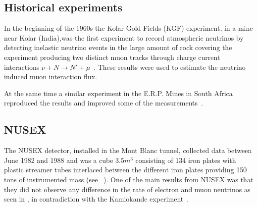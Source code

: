 

\subsection{Historical experiments}
In the beginning of the 1960s the Kolar Gold Fields (KGF) experiment, in a mine near Kolar (India),was the first experiment to record atmospheric neutrinos by detecting inelastic neutrino events in the large amount of rock covering the experiment producing two distinct muon tracks through charge current interactions $\nu + N \rightarrow N' + \mu $~\cite{96Achar}. These results were used to estimate the neutrino induced muon interaction flux. %

At the same time a similar experiment in the E.R.P. Mines in South Africa reproduced the results and improved some of the measurements~\cite{97Reines}.

\subsection{NUSEX}
The NUSEX detector, installed in the Mont Blanc tunnel, collected data between June 1982 and 1988 and was a cube $3.5m^3$ consisting of 134 iron plates with plastic streamer tubes interlaced between the different iron plates providing 150 tons of instrumented mass (see ~). One of the main results from NUSEX was that they did not observe any difference in the rate of electron and muon neutrinos as seen in , in contradiction with the Kamiokande experiment~\cite{56NUSEX, 57NUSEX}.

